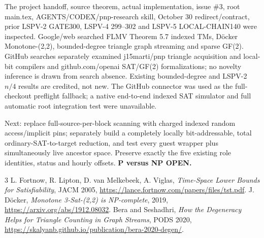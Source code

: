 \documentclass[11pt]{article}
\begin{document}
The project handoff, source theorem, actual implementation, issue \#3, root main.tex, AGENTS/CODEX/pnp-research skill, October 30 redirect/contract, prior LSPV-2 GATE300, LSPV-4 299--302 and LSPV-5 LOCAL-CHAIN140 were inspected. Google/web searched FLMV Theorem 5.7 indexed TMs, D\"ocker Monotone-(2,2), bounded-degree triangle graph streaming and sparse GF(2). GitHub searches separately examined j15marti/pnp triangle acquisition and local-bit compilers and github.com/openai SAT/GF(2) formalizations; no novelty inference is drawn from search absence. Existing bounded-degree and LSPV-2 $n/4$ results are credited, not new. The GitHub connector was used as the full-checkout preflight fallback; a native end-to-end indexed SAT simulator and full automatic root integration test were unavailable.

Next: replace full-source-per-block scanning with charged indexed random access/implicit pins; separately build a completely locally bit-addressable, total ordinary-SAT-to-target reduction, and test every guest wrapper plus simultaneously live ancestor space. Preserve exactly the five existing role identities, status and hourly offsets. \textbf{P versus NP OPEN.}

\begin{thebibliography}{3}
 L. Fortnow, R. Lipton, D. van Melkebeek, A. Viglas, \emph{Time-Space Lower Bounds for Satisfiability}, JACM 2005, \url{https://lance.fortnow.com/papers/files/tst.pdf}.
 J. D\"ocker, \emph{Monotone 3-Sat-(2,2) is NP-complete}, 2019, \url{https://arxiv.org/abs/1912.08032}.
 Bera and Seshadhri, \emph{How the Degeneracy Helps for Triangle Counting in Graph Streams}, PODS 2020, \url{https://skalyanb.github.io/publication/bera-2020-degen/}.
\end{thebibliography}
\end{document}
